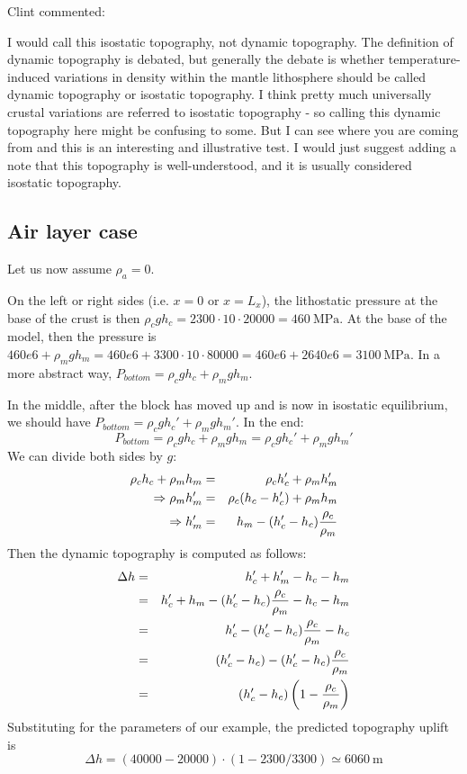 Clint commented: 
\begin{displayquote}
{\color{darkgray}
I would call this isostatic topography, not dynamic topography. The definition 
of dynamic topography is debated, but generally the debate is whether temperature-induced variations 
in density within the mantle lithosphere should be called dynamic topography or isostatic topography. 
I think pretty much universally crustal variations are referred to isostatic topography - 
so calling this dynamic topography here might be confusing to some. 
But I can see where you are coming from and this is an interesting and illustrative test. 
I would just suggest adding a note that this topography is well-understood, and it is usually considered isostatic topography.
}
\end{displayquote}

\newpage


\subsection*{Air layer case}

Let us now assume $\rho_a=0$. 

On the left or right sides (i.e. $x=0$ or $x=L_x$), the lithostatic pressure at the base of the crust is then 
$\rho_{c} g h_{c}=2300 \cdot 10 \cdot20000=460~\si{\mega\pascal}$.
At the base of the model, then the pressure is $460e6+\rho_{m} g h_{m}
=460e6+3300 \cdot 10 \cdot 80000=460e6+2640e6=3100~\si{\mega\pascal}$.
In a more abstract way, $P_{bottom}=\rho_c g h_c + \rho_m g h_m$.

In the middle, after the block has moved up and is now in isostatic equilibrium, 
we should have $P_{bottom}=\rho_c g h_c' + \rho_m g h_m'$.
In the end:
\[
P_{bottom}=\rho_c g h_c + \rho_m g h_m = \rho_c g h_c' + \rho_m g h_m'
\]
We can divide both sides by $g$:
\begin{eqnarray}
\rho_c  h_c + \rho_m  h_m &=& \rho_c  h_c' + \rho_m  h_m' \nonumber\\
\Rightarrow \rho_m h_m'&=& \rho_c(h_c-h_c') + \rho_m h_m  \nonumber\\
\Rightarrow h_m' &=& h_m-(h_c'-h_c)\frac{\rho_c}{\rho_m} \nonumber
\end{eqnarray}
Then the dynamic topography is computed as follows:
\begin{eqnarray}
\Delta h 
&=& h_c' + h_m' - h_c - h_m \nonumber\\
&=& h_c' + h_m -(h_c'-h_c)\frac{\rho_c}{\rho_m} -h_c - h_m \nonumber\\
&=& h_c'  -(h_c'-h_c)\frac{\rho_c}{\rho_m} -h_c  \nonumber\\
&=& (h_c'-h_c)  -(h_c'-h_c)\frac{\rho_c}{\rho_m}   \nonumber\\
&=& (h_c'-h_c) \left(1 -\frac{\rho_c}{\rho_m} \right) 
\end{eqnarray}
Substituting for the parameters of our example, the predicted topography uplift is 
\[
\Delta h = (40000-20000)\cdot (1-2300/3300) \simeq 6060~\si{\meter}
\]


